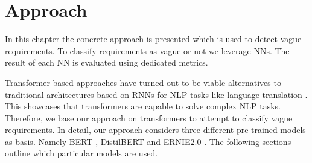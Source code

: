 \chapter{Approach}
\label{chp:approach}


In this chapter the concrete approach is presented which is used to detect vague requirements.
To classify requirements as vague or not we leverage \acp{NN}.
The result of each \ac{NN} is evaluated using dedicated metrics.

Transformer based approaches have turned out to be viable alternatives to traditional architectures based on \acp{RNN} for \ac{NLP} tasks like language translation \parencites{Gehring:2017}{Vaswani:2017}.
This showcases that transformers are capable to solve complex \ac{NLP} tasks.
Therefore, we base our approach on transformers to attempt to classify vague requirements.
In detail, our approach considers three different pre-trained models as basis.
Namely \ac{BERT} \parencite{Devlin:2018}, \ac{DistilBERT} \parencite{Sanh:2019} and \ac{ERNIE2.0} \parencite{Sun:2019a}.
The following sections outline which particular models are used.




